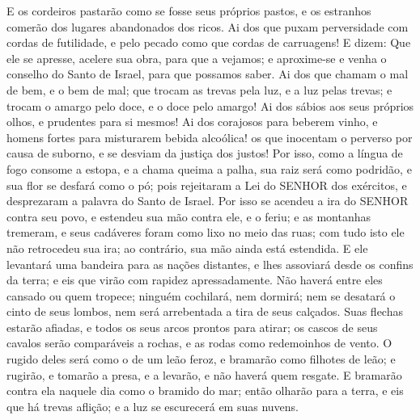 {  E os cordeiros pastarão como se fosse seus próprios pastos, e os estranhos comerão
{} dos lugares abandonados dos ricos.
  Ai dos que puxam perversidade com cordas de futilidade,
 e pelo pecado como que
{} cordas de carruagens!
  E dizem: Que ele se apresse, acelere sua obra, para que a vejamos; e aproxime-se e venha o conselho do Santo de Israel, para que possamos saber.
  Ai dos que chamam o mal de bem, e o bem de mal; que trocam as trevas pela luz, e a luz pelas trevas; e trocam o amargo pelo doce, e o doce pelo amargo!
  Ai dos
{} sábios aos seus próprios olhos, e prudentes para si mesmos!
  Ai dos
{} corajosos para beberem vinho, e homens fortes para misturarem bebida alcoólica!
   os que inocentam o perverso por causa de suborno, e se desviam da justiça dos justos!
  Por isso, como a língua de fogo consome a estopa, e a chama queima a palha,
{} sua raiz será como podridão, e sua flor se desfará como o pó; pois rejeitaram a Lei do SENHOR dos exércitos, e desprezaram a palavra do Santo de Israel.
  Por isso se acendeu a ira do SENHOR contra seu povo, e estendeu sua mão contra ele, e o feriu; e as montanhas tremeram, e seus cadáveres foram como lixo no meio das ruas; com tudo isto ele não retrocedeu sua ira; ao contrário, sua mão ainda está estendida.
  E ele levantará uma bandeira para as nações distantes, e lhes assoviará desde os confins da terra; e eis que virão com rapidez apressadamente.
  Não haverá entre eles cansado ou quem tropece; ninguém cochilará, nem dormirá; nem se desatará o cinto de seus lombos, nem será arrebentada a tira de seus calçados.
  Suas flechas estarão afiadas, e todos os seus arcos prontos para atirar; os cascos de seus cavalos serão comparáveis a rochas, e as rodas
{} como redemoinhos de vento.
  O rugido deles será como o de um leão feroz, e bramarão como filhotes de leão; e rugirão, e tomarão a presa, e a levarão, e não haverá quem
{} resgate.
  E bramarão contra ela naquele dia como o bramido do mar; então olharão para a terra, e eis que há trevas
{} aflição; e a luz se escurecerá em suas nuvens.
\par }

